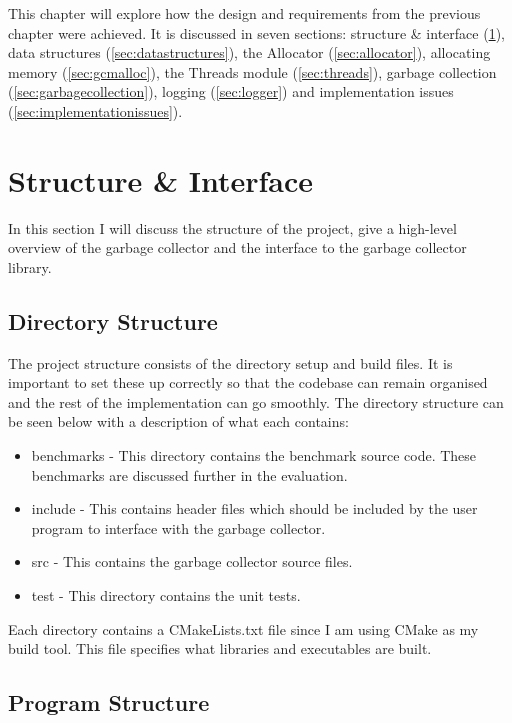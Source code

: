 \documentclass[../diss.tex]{subfiles}
\begin{document}
This chapter will explore how the design and requirements from the previous chapter were achieved. It is discussed in seven sections: structure \& interface (\cref{sec:structureandinterface}), data structures (\cref{sec:datastructures}), the Allocator (\cref{sec:allocator}), allocating memory (\cref{sec:gcmalloc}), the Threads module (\cref{sec:threads}), garbage collection (\cref{sec:garbagecollection}), logging (\cref{sec:logger}) and implementation issues (\cref{sec:implementationissues}).

\section{Structure \& Interface}
\label{sec:structureandinterface}

In this section I will discuss the structure of the project, give a high-level overview of the garbage collector and the interface to the garbage collector library.

\subsection{Directory Structure}

The project structure consists of the directory setup and build files. It is important to set these up correctly so that the codebase can remain organised and the rest of the implementation can go smoothly. The directory structure can be seen below with a description of what each contains:
\begin{itemize}
    \item benchmarks - This directory contains the benchmark source code. These benchmarks are discussed further in the evaluation.
    \item include - This contains header files which should be included by the user program to interface with the garbage collector.
    \item src - This contains the garbage collector source files.
    \item test - This directory contains the unit tests.
\end{itemize}

Each directory contains a CMakeLists.txt file since I am using CMake as my build tool. This file specifies what libraries and executables are built.

\subsection{Program Structure}
\end{document}
